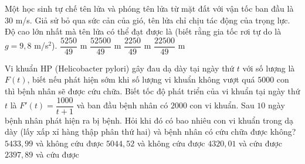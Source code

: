 \begin{ex}%
	Một học sinh tự chế tên lửa và phóng tên lửa từ mặt đất với vận tốc ban đầu là $30$ m/s. Giả sử bỏ qua sức cản của gió, tên lửa chỉ chịu tác động của trọng lực. Độ cao lớn nhất mà tên lửa có thể đạt được là (biết rằng gia tốc rơi tự do là $g=9{,}8$ m/s$^2$).
	\choice
	{$\dfrac{5250}{49}$ m}
	{$\dfrac{52500}{49}$ m}
	{\True $\dfrac{2250}{49}$ m}
	{$\dfrac{22500}{49}$ m}
\end{ex}

\begin{ex}%
	Vi khuẩn HP (Helicobacter pylori) gây đau dạ dày tại ngày thứ $t$ với số lượng là $F(t)$, biết nếu phát hiện sớm khi số lượng vi khuẩn không vượt quá $5000$ con thì bệnh nhân sẽ được cứu chữa. Biết tốc độ phát triển của vi khuẩn tại ngày thứ $t$ là $F'(t)=\dfrac{1000}{t+1}$ và ban đầu bệnh nhân có $2000$ con vi khuẩn. Sau $10$ ngày bệnh nhân phát hiện ra bị bệnh. Hỏi khi đó có bao nhiêu con vi khuẩn trong dạ dày (lấy xấp xỉ hàng thập phân thứ hai) và bệnh nhân có cứu chữa được không?
	\choice
	{$5433{,}99$ và không cứu được}
	{\True $5044{,}52$ và không cứu được}
	{$4320{,}01$ và cứu được}
	{$2397{,}89$ và cứu được}
\end{ex}

